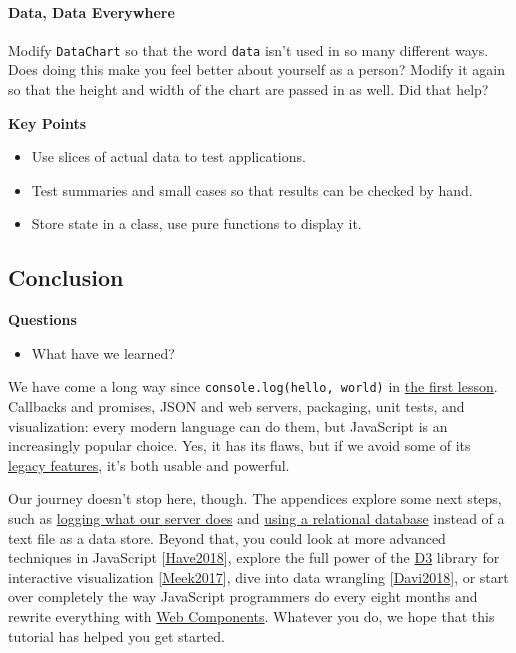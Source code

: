 \paragraph{Data, Data Everywhere}\label{data-data-everywhere}

Modify \texttt{DataChart} so that the word \texttt{data} isn't used in
so many different ways. Does doing this make you feel better about
yourself as a person? Modify it again so that the height and width of
the chart are passed in as well. Did that help?

\textbf{Key Points}

\begin{itemize}
\tightlist
\item
  Use slices of actual data to test applications.
\item
  Test summaries and small cases so that results can be checked by hand.
\item
  Store state in a class, use pure functions to display it.
\end{itemize}

\hypertarget{s:finale}{\subsection{Conclusion}\label{s:finale}}

\textbf{Questions}

\begin{itemize}
\tightlist
\item
  What have we learned?
\end{itemize}

We have come a long way since
\texttt{console.log(\textquotesingle{}hello,\ world\textquotesingle{})}
in \protect\hyperlink{s:basics}{the first lesson}. Callbacks and
promises, JSON and web servers, packaging, unit tests, and
visualization: every modern language can do them, but JavaScript is an
increasingly popular choice. Yes, it has its flaws, but if we avoid some
of its \protect\hyperlink{s:legacy}{legacy features}, it's both usable
and powerful.

Our journey doesn't stop here, though. The appendices explore some next
steps, such as \protect\hyperlink{s:logging}{logging what our server
does} and \protect\hyperlink{s:db}{using a relational database} instead
of a text file as a data store. Beyond that, you could look at more
advanced techniques in JavaScript
{[}\protect\hyperlink{Have2018}{Have2018}{]}, explore the full power of
the \href{https://d3js.org/}{D3} library for interactive visualization
{[}\protect\hyperlink{Meek2017}{Meek2017}{]}, dive into data wrangling
{[}\protect\hyperlink{Davi2018}{Davi2018}{]}, or start over completely
the way JavaScript programmers do every eight months and rewrite
everything with
\href{https://developer.mozilla.org/en-US/docs/Web/Web_Components}{Web
Components}. Whatever you do, we hope that this tutorial has helped you
get started.

